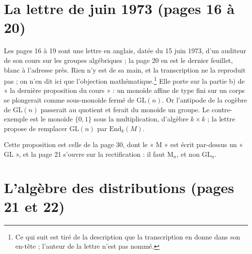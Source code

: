 \documentclass[11pt,a4paper]{article}
\begin{document}
\section*{La lettre de juin 1973 (pages 16 à 20)}

Les pages 16 à 19 sont une lettre en anglais, datée du 15 juin 1973, d'un
auditeur de son cours sur les groupes algébriques ; la page 20 en est le
dernier feuillet, blanc à l'adresse près. Rien n'y est de sa main, et la
transcription ne la reproduit pas ; on n'en dit ici que l'objection
mathématique.\footnote{Ce qui suit est tiré de la description que la
transcription en donne dans son en-tête ; l'auteur de la lettre n'est pas
nommé.}
Elle porte sur la partie b) de « la dernière proposition du cours » : un
monoïde affine de type fini sur un corps se plongerait comme sous-monoïde
fermé de $\mathrm{GL}(n)$. Or l'antipode de la cogèbre de $\mathrm{GL}(n)$
passerait au quotient et ferait du monoïde un groupe. Le contre-exemple est le
monoïde $\{0, 1\}$ sous la multiplication, d'algèbre $k \times k$ ; la lettre
propose de remplacer $\mathrm{GL}(n)$ par $\mathrm{End}_{k}(M)$.

Cette proposition est celle de la page 30, dont le « $\mathrm{M}$ » est écrit
par-dessus un « $\mathrm{GL}$ », et la page 21 s'ouvre sur la
rectification : il faut $\mathrm{M}_{n}$, et non $\mathrm{GL}_{n}$.

\section*{L'algèbre des distributions (pages 21 et 22)}
\end{document}
